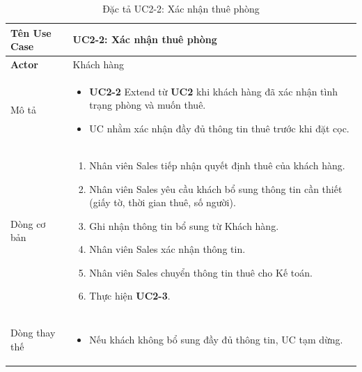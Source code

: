 
\noindent
\begin{table}[H]
    \centering
\begin{tabularx}{\textwidth}{|>{\centering\arraybackslash\bfseries}m{3.5cm}|X|}
    \hline
    Tên Use Case & {\centering\textbf{UC2-2: Xác nhận thuê phòng}\par} \\ 
    \hline
    
    Actor & Khách hàng \\ 
    \hline

    Mô tả & 
    \vspace{0.2cm}
    \begin{itemize}[leftmargin=*, nosep, label=-]
        \item \textbf{UC2-2} Extend từ \textbf{UC2} khi khách hàng đã xác nhận tình trạng phòng và muốn thuê.
        \item UC nhằm xác nhận đầy đủ thông tin thuê trước khi đặt cọc.
    \end{itemize} \\ 
    \hline
    
    Dòng cơ bản &
    \vspace{0.2cm}
    \begin{enumerate}[leftmargin=*, nosep]
        \item Nhân viên Sales tiếp nhận quyết định thuê của khách hàng.
        \item Nhân viên Sales yêu cầu khách bổ sung thông tin cần thiết (giấy tờ, thời gian thuê, số người).
        \item Ghi nhận thông tin bổ sung từ Khách hàng.
        \item Nhân viên Sales xác nhận thông tin.
        \item Nhân viên Sales chuyển thông tin thuê cho Kế toán.
        \item Thực hiện \textbf{UC2-3}.
    \end{enumerate} \\ 
    \hline
    
    Dòng thay thế &
    \vspace{0.2cm}
    \begin{itemize}[leftmargin=*, nosep, label=-]
        \item Nếu khách không bổ sung đầy đủ thông tin, UC tạm dừng.
    \end{itemize} \\ 
    \hline
\end{tabularx}
\caption{Đặc tả UC2-2: Xác nhận thuê phòng}
\end{table}

